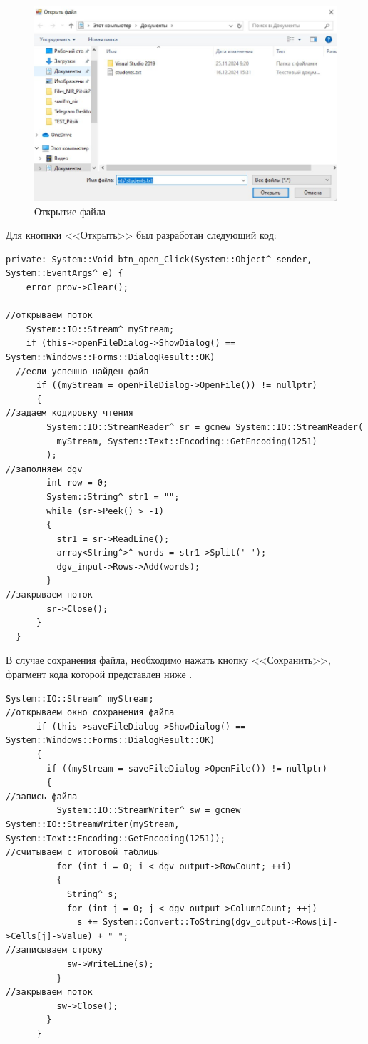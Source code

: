 \begin{figure}[H]
\centering
\includegraphics[scale=.65]{../img/files/files_open.jpg}
\caption{Открытие файла}
\label{fig:files_open}
\end{figure}

Для кнопнки <<Открыть>> был разработан следующий код:
\begin{verbatim}
private: System::Void btn_open_Click(System::Object^ sender, System::EventArgs^ e) {
    error_prov->Clear();

//открываем поток 
    System::IO::Stream^ myStream;
    if (this->openFileDialog->ShowDialog() == System::Windows::Forms::DialogResult::OK)
  //если успешно найден файл
      if ((myStream = openFileDialog->OpenFile()) != nullptr)
      {
//задаем кодировку чтения
        System::IO::StreamReader^ sr = gcnew System::IO::StreamReader(
          myStream, System::Text::Encoding::GetEncoding(1251)
        );
//заполняем dgv
        int row = 0;
        System::String^ str1 = "";
        while (sr->Peek() > -1)
        {
          str1 = sr->ReadLine();
          array<String^>^ words = str1->Split(' ');
          dgv_input->Rows->Add(words);
        }
//закрываем поток
        sr->Close();
      }
  }
\end{verbatim}

В случае сохранения файла, необходимо нажать кнопку <<Сохранить>>, фрагмент кода которой представлен ниже \cite{book_gui}.
\begin{verbatim}
System::IO::Stream^ myStream;
//открываем окно сохранения файла
      if (this->saveFileDialog->ShowDialog() == System::Windows::Forms::DialogResult::OK)
      {
        if ((myStream = saveFileDialog->OpenFile()) != nullptr)
        {
//запись файла
          System::IO::StreamWriter^ sw = gcnew System::IO::StreamWriter(myStream, System::Text::Encoding::GetEncoding(1251));
//считываем с итоговой таблицы
          for (int i = 0; i < dgv_output->RowCount; ++i)
          {
            String^ s;
            for (int j = 0; j < dgv_output->ColumnCount; ++j)
              s += System::Convert::ToString(dgv_output->Rows[i]->Cells[j]->Value) + " ";
//записываем строку
            sw->WriteLine(s);
          }
//закрываем поток
          sw->Close();
        }
      }
\end{verbatim}

